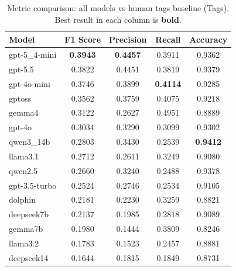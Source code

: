 \begin{table}[H]
    \centering
    \caption[Metric comparison: all models vs human tags baseline]{Metric comparison: all models vs human tags baseline (Tags).
             Best result in each column is \textbf{bold}.}
    \label{tab:f1-results}
    \begin{tabular}{lcccc}
        \hline
        \textbf{Model} & \textbf{F1 Score} & \textbf{Precision} & \textbf{Recall} & \textbf{Accuracy} \\
        \hline
        gpt-5\_4-mini       & \textbf{0.3943} & \textbf{0.4457} & 0.3911          & 0.9362 \\
        gpt-5.5             & 0.3822          & 0.4451          & 0.3819          & 0.9379 \\
        gpt-4o-mini         & 0.3746          & 0.3899          & \textbf{0.4114} & 0.9285 \\
        gptoss              & 0.3562          & 0.3759          & 0.4075          & 0.9218 \\
        gemma4              & 0.3122          & 0.2627          & 0.4951          & 0.8889 \\
        gpt-4o              & 0.3034          & 0.3290          & 0.3099          & 0.9302 \\
        qwen3\_14b          & 0.2803          & 0.3430          & 0.2539          & \textbf{0.9412} \\
        llama3.1            & 0.2712          & 0.2611          & 0.3249          & 0.9080 \\
        qwen2.5             & 0.2660          & 0.3240          & 0.2488          & 0.9378 \\
        gpt-3.5-turbo       & 0.2524          & 0.2746          & 0.2534          & 0.9105 \\
        dolphin             & 0.2181          & 0.2230          & 0.3259          & 0.8821 \\
        deepseek7b          & 0.2137          & 0.1985          & 0.2818          & 0.9089 \\
        gemma7b             & 0.1980          & 0.1444          & 0.3809          & 0.8246 \\
        llama3.2            & 0.1783          & 0.1523          & 0.2457          & 0.8881 \\
        deepseek14          & 0.1644          & 0.1815          & 0.1849          & 0.8731 \\
        \hline
    \end{tabular}
\end{table}

